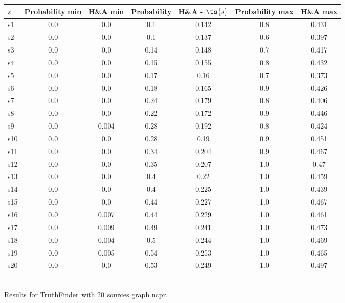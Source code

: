\documentclass{article}
\begin{document}
\noindent\begin{tabular}{|l|c|c|c|c|c|c|}
\hline
$s$& Probability min & H\&A min & Probability & H\&A - $\ts{s}$ & Probability max & H\&A max\\
\hline
s1 &0.0 & 0.0 & 0.1 & 0.142 & 0.8 & 0.431\\
\hline
s2 &0.0 & 0.0 & 0.1 & 0.137 & 0.6 & 0.397\\
\hline
s3 &0.0 & 0.0 & 0.14 & 0.148 & 0.7 & 0.417\\
\hline
s4 &0.0 & 0.0 & 0.15 & 0.155 & 0.8 & 0.432\\
\hline
s5 &0.0 & 0.0 & 0.17 & 0.16 & 0.7 & 0.373\\
\hline
s6 &0.0 & 0.0 & 0.18 & 0.165 & 0.9 & 0.426\\
\hline
s7 &0.0 & 0.0 & 0.24 & 0.179 & 0.8 & 0.406\\
\hline
s8 &0.0 & 0.0 & 0.22 & 0.172 & 0.9 & 0.446\\
\hline
s9 &0.0 & 0.004 & 0.28 & 0.192 & 0.8 & 0.424\\
\hline
s10 &0.0 & 0.0 & 0.28 & 0.19 & 0.9 & 0.451\\
\hline
s11 &0.0 & 0.0 & 0.34 & 0.204 & 0.9 & 0.467\\
\hline
s12 &0.0 & 0.0 & 0.35 & 0.207 & 1.0 & 0.47\\
\hline
s13 &0.0 & 0.0 & 0.4 & 0.22 & 1.0 & 0.459\\
\hline
s14 &0.0 & 0.0 & 0.4 & 0.225 & 1.0 & 0.439\\
\hline
s15 &0.0 & 0.0 & 0.44 & 0.227 & 1.0 & 0.467\\
\hline
s16 &0.0 & 0.007 & 0.44 & 0.229 & 1.0 & 0.461\\
\hline
s17 &0.0 & 0.009 & 0.49 & 0.241 & 1.0 & 0.473\\
\hline
s18 &0.0 & 0.004 & 0.5 & 0.244 & 1.0 & 0.469\\
\hline
s19 &0.0 & 0.005 & 0.54 & 0.253 & 1.0 & 0.465\\
\hline
s20 &0.0 & 0.0 & 0.53 & 0.249 & 1.0 & 0.497\\
\hline
\end{tabular}\\

\noindent Results for TruthFinder with 20 sources graph ncpr.
\end{document}
